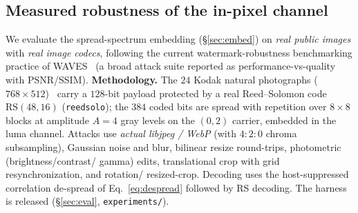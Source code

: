 \documentclass[journal]{IEEEtran}
\begin{document}
\fi
\subsection{Measured robustness of the in-pixel channel}\label{sec:robust}
We evaluate the spread-spectrum embedding (\S\ref{sec:embed}) on
\emph{real public images} with \emph{real image codecs}, following the current
watermark-robustness benchmarking practice of WAVES~\cite{an2024waves} (a broad
attack suite reported as performance-vs-quality with PSNR/SSIM).
\textbf{Methodology.} The $24$ \mbox{Kodak} natural photographs
($768\!\times\!512$)~\cite{kodak} carry a $128$-bit payload protected by a real
Reed--Solomon code $\mathrm{RS}(48,16)$ (\texttt{reedsolo}); the $384$ coded bits
are spread with repetition over $8\!\times\!8$ blocks at amplitude $A\!=\!4$ gray
levels on the $(0,2)$ carrier, embedded in the luma channel. Attacks use
\emph{actual libjpeg / WebP} (with $4{:}2{:}0$ chroma subsampling), Gaussian
noise and blur, bilinear resize round-trips, photometric (brightness/contrast/
gamma) edits, translational crop with grid resynchronization, and rotation/
resized-crop. Decoding uses the host-suppressed correlation de-spread of
Eq.~\eqref{eq:despread} followed by RS decoding. The harness is released
(\S\ref{sec:eval}, \texttt{experiments/}).
\end{document}
